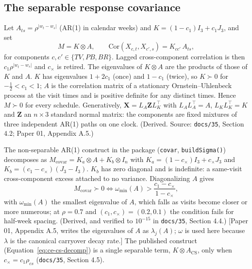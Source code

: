 \documentclass[11pt]{article}
\newcommand{\note}[1]{\textcolor{blue!60!black}{\small [#1]}}
\newcommand{\code}[1]{\texttt{#1}}
\begin{document}
\subsection{The separable response covariance}
\label{sec:ce-sep}

Let $A_{ts} = \rho^{|w_t - w_s|}$ (AR(1) in calendar weeks) and
$K = (1 - c_1) I_3 + c_1 J_3$, and set
\begin{equation}
M = K \otimes A, \qquad
\mathrm{Cor}(X_{c,t}, X_{c',s}) = K_{cc'}\, A_{ts},
\label{eq:ce-sep}
\end{equation}
for components $c, c' \in \{TV, PB, BR\}$. Lagged cross-component
correlation is then $c_1 \rho^{|w_t - w_s|}$ and $c_\times$ is
retired. The eigenvalues of $K \otimes A$ are the products of those of
$K$ and $A$. $K$ has eigenvalues $1 + 2c_1$ (once) and $1 - c_1$
(twice), so $K \succ 0$ for $-\tfrac12 < c_1 < 1$; $A$ is the
correlation matrix of a stationary Ornstein--Uhlenbeck process at the
visit times and is positive definite for any distinct times. Hence
$M \succ 0$ for every schedule. Generatively,
$\mathbf X = L_A \mathbf Z L_K^{\top}$ with $L_A L_A^{\top} = A$,
$L_K L_K^{\top} = K$ and $\mathbf Z$ an $n \times 3$ standard normal
matrix: the components are fixed mixtures of three independent AR(1)
paths on one clock. (Derived. Source: \code{docs/35}, Section 4.2;
Paper 01, Appendix A.5.)

The non-separable AR(1) construct in the package (\code{covar},
\code{buildSigma()}) decomposes as
$M_{\mathrm{covar}} = K_a \otimes A + K_b \otimes I_n$ with
$K_a = (1 - c_\times)I_3 + c_\times J_3$ and
$K_b = (c_1 - c_\times)(J_3 - I_3)$. $K_b$ has zero diagonal and is
indefinite: a same-visit cross-component excess attached to no
variance. Diagonalizing $A$ gives
\begin{equation}
M_{\mathrm{covar}} \succ 0 \iff
\omega_{\min}(A) > \frac{c_1 - c_\times}{1 - c_\times},
\label{eq:ce-covar-pd}
\end{equation}
with $\omega_{\min}(A)$ the smallest eigenvalue of $A$, which falls as
visits become closer or more numerous; at $\rho = 0.7$ and
$(c_1, c_\times) = (0.2, 0.1)$ the condition fails for half-week
spacing. (Derived, and verified to $10^{-15}$ in \code{docs/35},
Section 4.4.) \note{Paper 01, Appendix A.5, writes the eigenvalues of
$A$ as $\lambda_j(A)$; $\omega$ is used here because $\lambda$ is the
canonical carryover decay rate.} The published construct
(Equation~\eqref{eq:ce-cs-decomp}) is a single separable term,
$K \otimes A_{\mathrm{CS}}$, only when $c_\times = c_1\rho_{cs}$
(\code{docs/35}, Section 4.5).
\end{document}
